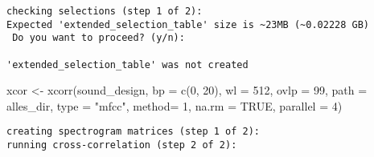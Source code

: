 \documentclass[
]{article}
\newenvironment{Shaded}{\begin{snugshade}}{\end{snugshade}}
\newcommand{\AttributeTok}[1]{\textcolor[rgb]{0.77,0.63,0.00}{#1}}
\newcommand{\ConstantTok}[1]{\textcolor[rgb]{0.00,0.00,0.00}{#1}}
\newcommand{\DecValTok}[1]{\textcolor[rgb]{0.00,0.00,0.81}{#1}}
\newcommand{\FunctionTok}[1]{\textcolor[rgb]{0.00,0.00,0.00}{#1}}
\newcommand{\NormalTok}[1]{#1}
\newcommand{\OtherTok}[1]{\textcolor[rgb]{0.56,0.35,0.01}{#1}}
\newcommand{\SpecialCharTok}[1]{\textcolor[rgb]{0.00,0.00,0.00}{#1}}
\newcommand{\StringTok}[1]{\textcolor[rgb]{0.31,0.60,0.02}{#1}}
\begin{document}
\begin{Shaded}
\end{Shaded}

\begin{verbatim}
checking selections (step 1 of 2):
Expected 'extended_selection_table' size is ~23MB (~0.02228 GB) 
 Do you want to proceed? (y/n): 

'extended_selection_table' was not created
\end{verbatim}

\begin{Shaded}
\begin{Highlighting}[]
\NormalTok{xcor }\OtherTok{\textless{}{-}} \FunctionTok{xcorr}\NormalTok{(sound\_design, }\AttributeTok{bp =} \FunctionTok{c}\NormalTok{(}\DecValTok{0}\NormalTok{, }\DecValTok{20}\NormalTok{), }\AttributeTok{wl =} \DecValTok{512}\NormalTok{, }\AttributeTok{ovlp =} \DecValTok{99}\NormalTok{, }\AttributeTok{path =}\NormalTok{ alles\_dir,}
              \AttributeTok{type =} \StringTok{"mfcc"}\NormalTok{, }\AttributeTok{method=} \DecValTok{1}\NormalTok{, }\AttributeTok{na.rm =} \ConstantTok{TRUE}\NormalTok{,}
              \AttributeTok{parallel =} \DecValTok{4}\NormalTok{)}
\end{Highlighting}
\end{Shaded}

\begin{verbatim}
creating spectrogram matrices (step 1 of 2):
running cross-correlation (step 2 of 2):
\end{verbatim}
\end{document}
